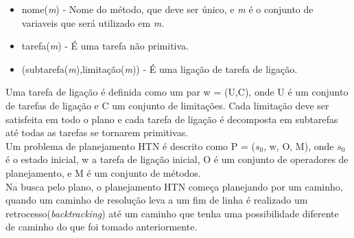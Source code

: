 \begin{itemize}
	\item nome(\textit{m}) - Nome do método, que deve ser único, e \textit{m} é o conjunto de variaveis que será utilizado em \textit{m}. 
	\item tarefa(\textit{m}) - É uma tarefa não primitiva.
	\item (subtarefa(\textit{m}),limitação(\textit{m})) - É uma ligação de tarefa de ligação.
\end{itemize}

Uma tarefa de ligação é definida como um par w = (U,C), onde U é um conjunto de tarefas de ligação e C um conjunto de limitações. Cada limitação deve ser satisfeita em todo o plano e cada tarefa de ligação é decomposta em subtarefas até todas as tarefas se tornarem primitivas. \\

Um problema de planejamento HTN é descrito como P = ($s_{0}$, w, O, M), onde $s_{0}$ é o estado inicial, w a tarefa de ligação inicial, O é um conjunto de operadores de planejamento, e M é um conjunto de métodos. \\

Na busca pelo plano, o planejamento HTN começa planejando por um caminho, quando um caminho de resolução leva a um fim de linha é realizado um retrocesso(\textit{backtracking}) até um caminho que tenha uma possibilidade diferente de caminho do que foi tomado anteriormente.




